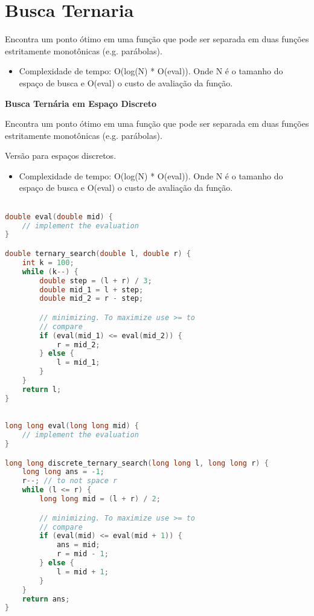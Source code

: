 \documentclass[11pt, a4paper, oneside]{book}
\begin{document}
\hfill

\section{Busca Ternaria}


Encontra um ponto ótimo em uma função que pode ser separada em duas funções estritamente monotônicas (e.g. parábolas).



\begin{itemize}
\item Complexidade de tempo: O(log(N) * O(eval)). Onde N é o tamanho do espaço de busca e O(eval) o custo de avaliação da função.
\end{itemize}



\textbf{Busca Ternária em Espaço Discreto} 



Encontra um ponto ótimo em uma função que pode ser separada em duas funções estritamente monotônicas (e.g. parábolas).

Versão para espaços discretos.



\begin{itemize}
\item Complexidade de tempo: O(log(N) * O(eval)). Onde N é o tamanho do espaço de busca e O(eval) o custo de avaliação da função.
\end{itemize}

\hfill

\begin{multicols}{2}
\begin{lstlisting}[language=C++]

double eval(double mid) {
    // implement the evaluation
}

double ternary_search(double l, double r) {
    int k = 100;
    while (k--) {
        double step = (l + r) / 3;
        double mid_1 = l + step;
        double mid_2 = r - step;

        // minimizing. To maximize use >= to
        // compare
        if (eval(mid_1) <= eval(mid_2)) {
            r = mid_2;
        } else {
            l = mid_1;
        }
    }
    return l;
}
\end{lstlisting}
\end{multicols}

\hfill

\begin{multicols}{2}
\begin{lstlisting}[language=C++]

long long eval(long long mid) {
    // implement the evaluation
}

long long discrete_ternary_search(long long l, long long r) {
    long long ans = -1;
    r--; // to not space r
    while (l <= r) {
        long long mid = (l + r) / 2;

        // minimizing. To maximize use >= to
        // compare
        if (eval(mid) <= eval(mid + 1)) {
            ans = mid;
            r = mid - 1;
        } else {
            l = mid + 1;
        }
    }
    return ans;
}
\end{lstlisting}
\end{multicols}
\end{document}
